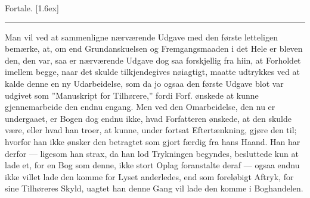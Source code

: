 \documentclass[12pt]{book}
\def\sperr#1{#1}%
\def\\{ }%
\newcommand{\sperr}[1]{\textls[180]{#1}}
\begin{document}

\begin{center}
  {\Large\sperr{Fortale.}}\\[1.6ex]
  \rule{0.30\linewidth}{0.4pt}
\end{center}

Man vil ved at sammenligne nærværende Udgave med den første letteligen
bemærke, at, om end Grundanskuelsen og Fremgangsmaaden i det Hele er bleven
den, den var, saa er nærværende Udgave dog saa forskjellig fra hiin, at
Forholdet imellem begge, naar det skulde tilkjendegives nøiagtigt, maatte
udtrykkes ved at kalde denne en ny Udarbeidelse, som da jo ogsaa den første
Udgave blot var udgivet som ''Manuskript for Tilhørere,'' fordi
Forf. ønskede at kunne gjennemarbeide den endnu engang. Men ved den
Omarbeidelse, den nu er undergaaet, er Bogen dog endnu ikke, hvad Forfatteren
ønskede, at den skulde være, eller hvad han troer, at kunne, under fortsat
Eftertænkning, gjøre den til; hvorfor han ikke ønsker den betragtet som gjort
færdig fra hans Haand. Han har derfor --- ligesom han strax, da han lod
Trykningen begyndes, besluttede kun at lade et, for en Bog som denne, ikke
stort Oplag foranstalte deraf --- ogsaa endnu ikke villet lade den komme for
Lyset anderledes, end som foreløbigt Aftryk, for sine Tilhøreres Skyld, uagtet
han denne Gang vil lade den komme i Boghandelen.
\end{document}
